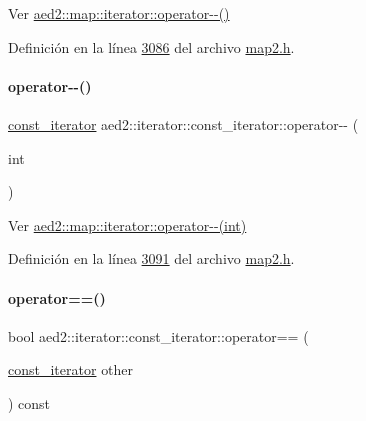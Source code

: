 Ver \hyperlink{classaed2_1_1map_1_1iterator_ae7f70f71545d2a9de17b65edaaec748a_ae7f70f71545d2a9de17b65edaaec748a}{aed2\+::map\+::iterator\+::operator-\/-\/()} 



Definición en la línea \hyperlink{map2_8h_source_l03086}{3086} del archivo \hyperlink{map2_8h_source}{map2.\+h}.

\mbox{\label{classaed2_1_1iterator_1_1const__iterator_a7e421ccf4290b2945d538c9991df7c74_a7e421ccf4290b2945d538c9991df7c74}} 
\paragraph{\texorpdfstring{operator-\/-\/()}{operator--()}\hspace{0.1cm}{\footnotesize\ttfamily [2/2]}}
{\footnotesize\ttfamily \hyperlink{classaed2_1_1iterator_1_1const__iterator}{const\+\_\+iterator} aed2\+::iterator\+::const\+\_\+iterator\+::operator-\/-\/ (\begin{DoxyParamCaption}\item[{int}]{ }\end{DoxyParamCaption})\hspace{0.3cm}{\ttfamily [inline]}}



Ver \hyperlink{classaed2_1_1map_1_1iterator_add45e9ddbb8eeda99326cdb9ac9dd225_add45e9ddbb8eeda99326cdb9ac9dd225}{aed2\+::map\+::iterator\+::operator-\/-\/(int)} 



Definición en la línea \hyperlink{map2_8h_source_l03091}{3091} del archivo \hyperlink{map2_8h_source}{map2.\+h}.

\mbox{\label{classaed2_1_1iterator_1_1const__iterator_aa96bbb56e80fa97a9974ef97c826fe3a_aa96bbb56e80fa97a9974ef97c826fe3a}} 
\paragraph{\texorpdfstring{operator==()}{operator==()}}
{\footnotesize\ttfamily bool aed2\+::iterator\+::const\+\_\+iterator\+::operator== (\begin{DoxyParamCaption}\item[{\hyperlink{classaed2_1_1iterator_1_1const__iterator}{const\+\_\+iterator}}]{other }\end{DoxyParamCaption}) const\hspace{0.3cm}{\ttfamily [inline]}}



